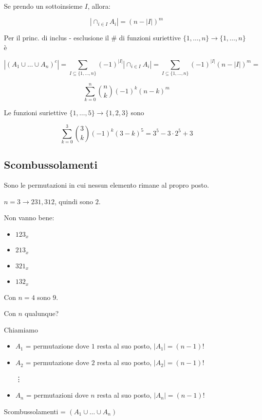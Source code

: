 \documentclass[11pt]{article}
\begin{document}
		Se prendo un sottoinsieme $I$, allora:

		\[
			|\cap_{i \in I} A_i| = (n-|I|)^{m}
		\]

		Per il princ. di inclus - esclusione il \# di funzioni
		suriettive $\{1,\ldots,n\} \to  \{1,\ldots,n\}$ \`e 

		\[
			|(A_1 \cup \ldots \cup A_n)^{c}| = 
			\sum_{I \subseteq \{1,\ldots,n\}} (-1)^{|I|} 
			|\cap_{i \in I}A_i|
			=
			\sum_{I \subseteq \{1,\ldots,n\}}(-1)^{|I|} (n-|I|)^{m} =
		\]

		\[
			\sum_{k=0}^{n}\binom{n}{k}(-1)^{k}(n-k)^{m}
		\]

		Le funzioni suriettive $\{1,\ldots,5\} \to  \{1,2,3\}$ sono

		\[
			\sum_{k=0}^{3}\binom{3}{k}(-1)^{k}(3-k)^{5} = 3^5 - 3 \cdot 2^5 + 3
		\]

		\subsection{Scombussolamenti}

		Sono le permutazioni in cui nessun elemento rimane al propro posto.

		$n=3 \longrightarrow 231,  312$, quindi sono $2$.
		
		Non vanno bene:

		\begin{itemize}
			\item $123_{x}$
			\item $213_{x}$
			\item $321_{x}$
			\item $132_{x}$
		\end{itemize}

		Con $n=4$ sono $9$.

		Con $n$ qualunque?

		Chiamiamo 

		\begin{itemize}
			\item $A_1$ = {permutazione dove $1$ resta al suo posto},
				$|A_1| = (n-1)!$
			\item $A_2$ = {permutazione dove $2$ resta al suo posto},
				$|A_2| = (n-1)!$
			
			\vdots
			\item $A_n$ = {permutazioni dove $n$ resta al suo posto},
				$|A_n| = (n-1)!$
		\end{itemize}

		Scombussolamenti = $(A_1 \cup \ldots \cup A_n)$
\end{document}
